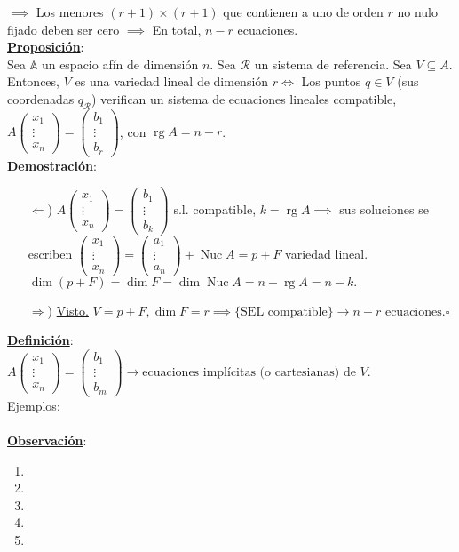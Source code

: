 \documentclass[11pt]{article}
\newcommand{\af}{\mathbb{A}}
\newcommand{\defi}{\underline{\textbf{Definición}}:\\}
\newcommand{\prop}{\underline{\textbf{Proposición}}:\\}
\newcommand{\dem}{\underline{\textbf{Demostración}}:\\}
\newcommand{\ej}{\underline{Ejemplos}:\\}
\newcommand{\obs}{\underline{\textbf{Observación}}: }
\DeclareMathOperator{\rg}{rg}
\DeclareMathOperator{\nuc}{Nuc}
\begin{document}
$\implies$ Los menores $(r+1)\times(r+1)$ que contienen a uno de orden $r$ no nulo fijado deben ser cero $\implies$ En total, $n-r$ ecuaciones.\\
\prop Sea $\af$ un espacio afín de dimensión $n$. Sea $\mathcal{R}$ un sistema de referencia. Sea $V\subseteq A$. Entonces, $V$ es una variedad lineal de dimensión $r\iff$ Los puntos $q\in V$ (sus coordenadas $q_{\mathcal{R}}$) verifican un sistema de ecuaciones lineales compatible, $A\begin{pmatrix}
x_1\\
\vdots\\
x_n
\end{pmatrix}=\begin{pmatrix}
b_1\\
\vdots\\
b_r
\end{pmatrix}
$, con $\rg A=n-r$.\\
\dem \begin{itemize}
	\item[$\Leftarrow$)] $A\begin{pmatrix}
	x_1\\ \vdots\\ x_n
	\end{pmatrix}=\begin{pmatrix}
	b_1\\ \vdots\\ b_k
	\end{pmatrix}$ s.l. compatible, $k=\rg A\implies$ sus soluciones se escriben $\begin{pmatrix}
	x_1\\ \vdots\\ x_n
	\end{pmatrix}=\begin{pmatrix}
	a_1\\ \vdots\\ a_n
	\end{pmatrix}+\nuc A=p+F
	$ variedad lineal. $\dim(p+F)=\dim F=\dim\nuc A=n-\rg A=n-k.$
	\item[$\Rightarrow$)] \underline{Visto.} $V=p+F,\dim F=r\implies\{\textrm{SEL compatible}\}\rightarrow n-r\textrm{ ecuaciones.}\square$
\end{itemize}
\defi $A\begin{pmatrix}
x_1\\ \vdots\\ x_n
\end{pmatrix}=\begin{pmatrix}
b_1\\ \vdots\\ b_m
\end{pmatrix}\rightarrow\textrm{ecuaciones implícitas (o cartesianas) de }V.$\\
\ej \\
\obs \begin{enumerate}
	\item
	\item
	\item
	\item
	\item
\end{enumerate}
\end{document}
